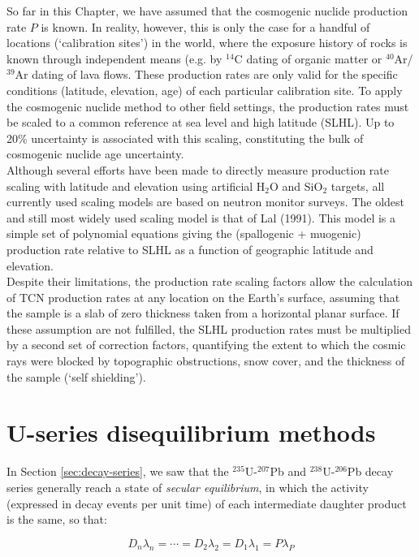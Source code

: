 \documentclass{book}
\begin{document}
So far in this Chapter, we have assumed that the cosmogenic nuclide
production rate $P$ is known. In reality, however, this is only the
case for a handful of locations (`calibration sites') in the world,
where the exposure history of rocks is known through independent means
(e.g. by $^{14}$C dating of organic matter or $^{40}$Ar/$^{39}$Ar
dating of lava flows. These production rates are only valid for the
specific conditions (latitude, elevation, age) of each particular
calibration site. To apply the cosmogenic nuclide method to other
field settings, the production rates must be scaled to a common
reference at sea level and high latitude (SLHL). Up to 20\%
uncertainty is associated with this scaling, constituting the bulk of
cosmogenic nuclide age uncertainty.\\

Although several efforts have been made to directly measure production
rate scaling with latitude and elevation using artificial H$_{2}$O and
SiO$_2$ targets, all currently used scaling models are based on
neutron monitor surveys. The oldest and still most widely used scaling
model is that of Lal (1991). This model is a simple set of polynomial
equations giving the (spallogenic + muogenic) production rate relative
to SLHL as a function of geographic latitude and elevation.\\

Despite their limitations, the production rate scaling factors allow
the calculation of TCN production rates at any location on the Earth's
surface, assuming that the sample is a slab of zero thickness taken
from a horizontal planar surface. If these assumption are not
fulfilled, the SLHL production rates must be multiplied by a second
set of correction factors, quantifying the extent to which the cosmic
rays were blocked by topographic obstructions, snow cover, and the
thickness of the sample (`self shielding').

\chapter[U-series dating]{U-series disequilibrium methods}
\label{sec:U-series}

In Section \ref{sec:decay-series}, we saw that the
$^{235}$U-$^{207}$Pb and $^{238}$U-$^{206}$Pb decay series generally
reach a state of \emph{secular equilibrium}, in which the activity
(expressed in decay events per unit time) of each intermediate
daughter product is the same, so that:

$$D_n \lambda_n = \cdots  = D_2 \lambda_2 = D_1 \lambda_1 = P \lambda_P$$
\end{document}
